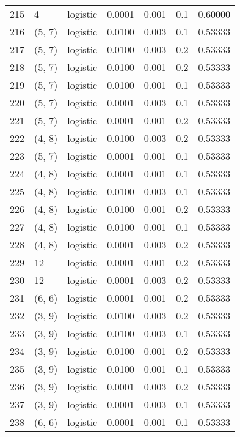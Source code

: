 \begin{tabular}{lllrrrr}
215 &           4 &  logistic &  0.0001 &  0.001 &  0.1 &   0.60000 \\
216 &      (5, 7) &  logistic &  0.0100 &  0.003 &  0.1 &   0.53333 \\
217 &      (5, 7) &  logistic &  0.0100 &  0.003 &  0.2 &   0.53333 \\
218 &      (5, 7) &  logistic &  0.0100 &  0.001 &  0.2 &   0.53333 \\
219 &      (5, 7) &  logistic &  0.0100 &  0.001 &  0.1 &   0.53333 \\
220 &      (5, 7) &  logistic &  0.0001 &  0.003 &  0.1 &   0.53333 \\
221 &      (5, 7) &  logistic &  0.0001 &  0.001 &  0.2 &   0.53333 \\
222 &      (4, 8) &  logistic &  0.0100 &  0.003 &  0.2 &   0.53333 \\
223 &      (5, 7) &  logistic &  0.0001 &  0.001 &  0.1 &   0.53333 \\
224 &      (4, 8) &  logistic &  0.0001 &  0.001 &  0.1 &   0.53333 \\
225 &      (4, 8) &  logistic &  0.0100 &  0.003 &  0.1 &   0.53333 \\
226 &      (4, 8) &  logistic &  0.0100 &  0.001 &  0.2 &   0.53333 \\
227 &      (4, 8) &  logistic &  0.0100 &  0.001 &  0.1 &   0.53333 \\
228 &      (4, 8) &  logistic &  0.0001 &  0.003 &  0.2 &   0.53333 \\
229 &          12 &  logistic &  0.0001 &  0.001 &  0.2 &   0.53333 \\
230 &          12 &  logistic &  0.0001 &  0.003 &  0.2 &   0.53333 \\
231 &      (6, 6) &  logistic &  0.0001 &  0.001 &  0.2 &   0.53333 \\
232 &      (3, 9) &  logistic &  0.0100 &  0.003 &  0.2 &   0.53333 \\
233 &      (3, 9) &  logistic &  0.0100 &  0.003 &  0.1 &   0.53333 \\
234 &      (3, 9) &  logistic &  0.0100 &  0.001 &  0.2 &   0.53333 \\
235 &      (3, 9) &  logistic &  0.0100 &  0.001 &  0.1 &   0.53333 \\
236 &      (3, 9) &  logistic &  0.0001 &  0.003 &  0.2 &   0.53333 \\
237 &      (3, 9) &  logistic &  0.0001 &  0.003 &  0.1 &   0.53333 \\
238 &      (6, 6) &  logistic &  0.0001 &  0.001 &  0.1 &   0.53333 \\

\end{tabular}
